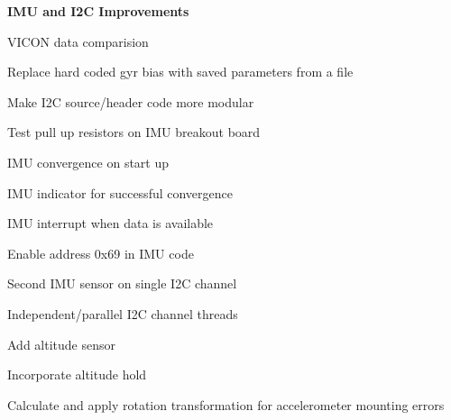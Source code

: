 \begin{DoxyItemize}
\item {\bfseries  I\+MU and I2C Improvements } 
\begin{DoxyItemize}
\item V\+I\+C\+ON data comparision  
\item Replace hard coded gyr bias with saved parameters from a file  
\item Make I2C source/header code more modular  
\item Test pull up resistors on I\+MU breakout board  
\item I\+MU convergence on start up  
\item I\+MU indicator for successful convergence  
\item I\+MU interrupt when data is available  
\item Enable address 0x69 in I\+MU code  
\item Second I\+MU sensor on single I2C channel  
\item Independent/parallel I2C channel threads  
\item Add altitude sensor  
\item Incorporate altitude hold  
\item Calculate and apply rotation transformation for accelerometer mounting errors  
\end{DoxyItemize}
\end{DoxyItemize}